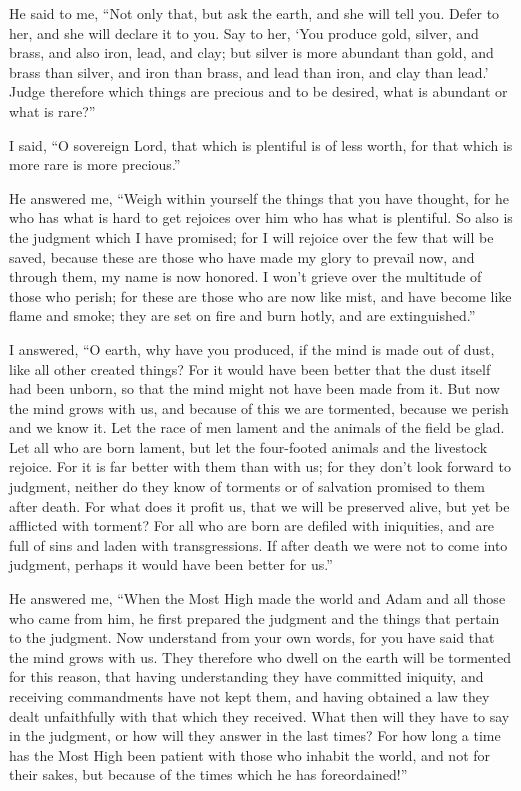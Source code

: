  He said to me, ``Not only that, but ask the earth, and
she will tell you. Defer to her, and she will declare it to you.
 Say to her, `You produce gold, silver, and brass, and
also iron, lead, and clay;  but silver is more abundant
than gold, and brass than silver, and iron than brass, and lead than
iron, and clay than lead.'  Judge therefore which things
are precious and to be desired, what is abundant or what is rare?''

 I said, ``O sovereign Lord, that which is plentiful is
of less worth, for that which is more rare is more precious.''

 He answered me, ``Weigh within yourself the things that
you have thought, for he who has what is hard to get rejoices over him
who has what is plentiful.  So also is the judgment which
I have promised; for I will rejoice over the few that will be saved,
because these are those who have made my glory to prevail now, and
through them, my name is now honored.  I won't grieve
over the multitude of those who perish; for these are those who are now
like mist, and have become like flame and smoke; they are set on fire
and burn hotly, and are extinguished.''

 I answered, ``O earth, why have you produced, if the
mind is made out of dust, like all other created things? 
For it would have been better that the dust itself had been unborn, so
that the mind might not have been made from it.  But now
the mind grows with us, and because of this we are tormented, because we
perish and we know it.  Let the race of men lament and
the animals of the field be glad. Let all who are born lament, but let
the four-footed animals and the livestock rejoice.  For
it is far better with them than with us; for they don't look forward to
judgment, neither do they know of torments or of salvation promised to
them after death.  For what does it profit us, that we
will be preserved alive, but yet be afflicted with torment?
 For all who are born are defiled with iniquities, and
are full of sins and laden with transgressions.  If after
death we were not to come into judgment, perhaps it would have been
better for us.''

 He answered me, ``When the Most High made the world and
Adam and all those who came from him, he first prepared the judgment and
the things that pertain to the judgment.  Now understand
from your own words, for you have said that the mind grows with us.
 They therefore who dwell on the earth will be tormented
for this reason, that having understanding they have committed iniquity,
and receiving commandments have not kept them, and having obtained a law
they dealt unfaithfully with that which they received. 
What then will they have to say in the judgment, or how will they answer
in the last times?  For how long a time has the Most High
been patient with those who inhabit the world, and not for their sakes,
but because of the times which he has foreordained!''

